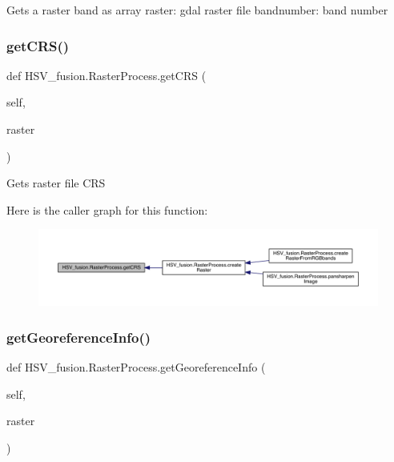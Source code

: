 \begin{DoxyVerb}Gets a raster band as array
raster: gdal raster file
bandnumber: band number
\end{DoxyVerb}
 \mbox{\label{class_h_s_v__fusion_1_1_raster_process_a4d3dab8ca726b36c6ed38e6cb89a9116}} 
\subsubsection{\texorpdfstring{get\+C\+R\+S()}{getCRS()}}
{\footnotesize\ttfamily def H\+S\+V\+\_\+fusion.\+Raster\+Process.\+get\+C\+RS (\begin{DoxyParamCaption}\item[{}]{self,  }\item[{}]{raster }\end{DoxyParamCaption})}

\begin{DoxyVerb}Gets raster file CRS
\end{DoxyVerb}
 Here is the caller graph for this function\+:
\nopagebreak
\begin{figure}[H]
\begin{center}
\leavevmode
\includegraphics[width=350pt]{class_h_s_v__fusion_1_1_raster_process_a4d3dab8ca726b36c6ed38e6cb89a9116_icgraph}
\end{center}
\end{figure}
\mbox{\label{class_h_s_v__fusion_1_1_raster_process_a357a8425c826c106f8f07106cf3178de}} 
\subsubsection{\texorpdfstring{get\+Georeference\+Info()}{getGeoreferenceInfo()}}
{\footnotesize\ttfamily def H\+S\+V\+\_\+fusion.\+Raster\+Process.\+get\+Georeference\+Info (\begin{DoxyParamCaption}\item[{}]{self,  }\item[{}]{raster }\end{DoxyParamCaption})}

